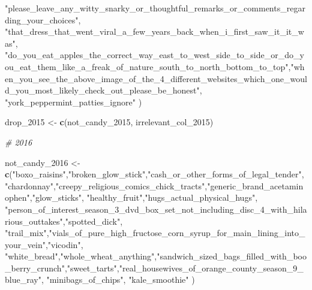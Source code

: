 \documentclass[
]{article}
\newenvironment{Shaded}{\begin{snugshade}}{\end{snugshade}}
\newcommand{\CommentTok}[1]{\textcolor[rgb]{0.56,0.35,0.01}{\textit{#1}}}
\newcommand{\FunctionTok}[1]{\textcolor[rgb]{0.13,0.29,0.53}{\textbf{#1}}}
\newcommand{\NormalTok}[1]{#1}
\newcommand{\OtherTok}[1]{\textcolor[rgb]{0.56,0.35,0.01}{#1}}
\newcommand{\StringTok}[1]{\textcolor[rgb]{0.31,0.60,0.02}{#1}}
\begin{document}
\begin{Shaded}
\begin{Highlighting}[]
\StringTok{"please\_leave\_any\_witty\_snarky\_or\_thoughtful\_remarks\_or\_comments\_regarding\_your\_choices"}\NormalTok{,}
\StringTok{"that\_dress\_that\_went\_viral\_a\_few\_years\_back\_when\_i\_first\_saw\_it\_it\_was"}\NormalTok{, }\StringTok{"do\_you\_eat\_apples\_the\_correct\_way\_east\_to\_west\_side\_to\_side\_or\_do\_you\_eat\_them\_like\_a\_freak\_of\_nature\_south\_to\_north\_bottom\_to\_top"}\NormalTok{,}\StringTok{"when\_you\_see\_the\_above\_image\_of\_the\_4\_different\_websites\_which\_one\_would\_you\_most\_likely\_check\_out\_please\_be\_honest"}\NormalTok{, }\StringTok{"york\_peppermint\_patties\_ignore"}
\NormalTok{)}

\NormalTok{drop\_2015 }\OtherTok{\textless{}{-}} \FunctionTok{c}\NormalTok{(not\_candy\_2015, irrelevant\_col\_2015)}

\CommentTok{\# 2016}

\NormalTok{not\_candy\_2016 }\OtherTok{\textless{}{-}} \FunctionTok{c}\NormalTok{(}\StringTok{"boxo\_raisins"}\NormalTok{,}\StringTok{"broken\_glow\_stick"}\NormalTok{,}\StringTok{"cash\_or\_other\_forms\_of\_legal\_tender"}\NormalTok{, }\StringTok{"chardonnay"}\NormalTok{,}\StringTok{"creepy\_religious\_comics\_chick\_tracts"}\NormalTok{,}\StringTok{"generic\_brand\_acetaminophen"}\NormalTok{,}\StringTok{"glow\_sticks"}\NormalTok{, }\StringTok{"healthy\_fruit"}\NormalTok{,}\StringTok{"hugs\_actual\_physical\_hugs"}\NormalTok{, }\StringTok{"person\_of\_interest\_season\_3\_dvd\_box\_set\_not\_including\_disc\_4\_with\_hilarious\_outtakes"}\NormalTok{,}\StringTok{"spotted\_dick"}\NormalTok{, }\StringTok{"trail\_mix"}\NormalTok{,}\StringTok{"vials\_of\_pure\_high\_fructose\_corn\_syrup\_for\_main\_lining\_into\_your\_vein"}\NormalTok{,}\StringTok{"vicodin"}\NormalTok{, }\StringTok{"white\_bread"}\NormalTok{,}\StringTok{"whole\_wheat\_anything"}\NormalTok{,}\StringTok{"sandwich\_sized\_bags\_filled\_with\_boo\_berry\_crunch"}\NormalTok{,}\StringTok{"sweet\_tarts"}\NormalTok{,}\StringTok{"real\_housewives\_of\_orange\_county\_season\_9\_blue\_ray"}\NormalTok{, }\StringTok{"minibags\_of\_chips"}\NormalTok{, }\StringTok{"kale\_smoothie"}
\NormalTok{)}


\end{Highlighting}
\end{Shaded}
\end{document}

